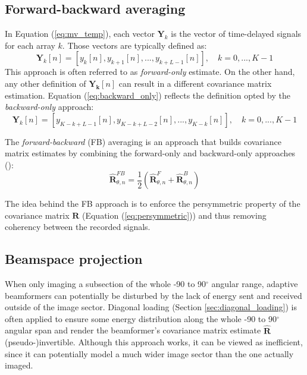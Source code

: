 \subsection{Forward-backward averaging}
\label{sec:fb_averaging}
In Equation (\ref{eq:mv_temp}), each vector $\boldsymbol{Y}_k$ is the vector of time-delayed signals for each array $k$. Those vectors are typically defined as:
\begin{equation}
    \boldsymbol{Y}_k[n] = [y_k[n], y_{k+1}[n],...,y_{k+L-1}[n]], \quad k = 0,...,K-1
\label{eq:forward_only}
\end{equation}
\noindent
This approach is often referred to as \textit{forward-only} estimate.
On the other hand, any other definition of $\boldsymbol{Y_k}[n]$ can result in a different covariance matrix estimation. Equation (\ref{eq:backward_only}) reflects the definition opted by the \textit{backward-only} approach:
\begin{equation}
    \boldsymbol{Y}_k[n] = [y_{K-k+L-1}[n], y_{K-k+L-2}[n],...,y_{K-k}[n]], \quad k = 0,...,K-1
\label{eq:backward_only}
\end{equation}
\noindent

The \textit{forward-backward} (FB) averaging is an approach that builds covariance matrix estimates by combining the forward-only and backward-only approaches (\cite{fb_averaging}):
\begin{equation}
    \boldsymbol{\hat{R}}_{\theta,n}^{FB} = \frac{1}{2} (\boldsymbol{\hat{R}}_{\theta,n}^F + \boldsymbol{\hat{R}}_{\theta,n}^B)
\label{eq:fb_averaging}
\end{equation}

The idea behind the FB approach is to enforce the persymmetric property of the covariance matrix $\boldsymbol{R}$ (Equation (\ref{eq:persymmetric})) and thus removing coherency between the recorded signals.


\subsection{Beamspace projection}
\label{sec:beamspace_projection}
When only imaging a subsection of the whole -90 to 90$^\circ$ angular range, adaptive beamformers can potentially be disturbed by the lack of energy sent and received outside of the image sector.
Diagonal loading (Section \ref{sec:diagonal_loading}) is often applied to ensure some energy distribution along the whole -90 to 90$^\circ$ angular span and render the beamformer's covariance matrix estimate $\boldsymbol{\hat{R}}$ (pseudo-)invertible. Although this approach works, it can be viewed as inefficient, since it can potentially model a much wider image sector than the one actually imaged.

